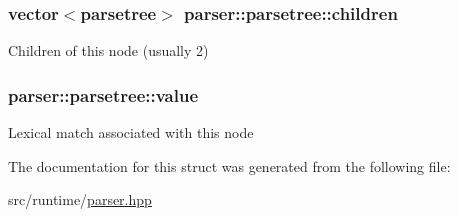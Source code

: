 \subsubsection[{\texorpdfstring{children}{children}}]{\setlength{\rightskip}{0pt plus 5cm}vector$<${\bf parsetree}$>$ parser\+::parsetree\+::children}\hypertarget{structparser_1_1parsetree_a46c4ae92fc6d3fb1ac7cbe2827728149}{}\label{structparser_1_1parsetree_a46c4ae92fc6d3fb1ac7cbe2827728149}
Children of this node (usually 2) 
\subsubsection[{\texorpdfstring{value}{value}}]{ parser\+::parsetree\+::value}\hypertarget{structparser_1_1parsetree_a4ee1d9214dd2a25fcf0494afaa9be7d7}{}\label{structparser_1_1parsetree_a4ee1d9214dd2a25fcf0494afaa9be7d7}
Lexical match associated with this node 

The documentation for this struct was generated from the following file\+:\begin{DoxyCompactItemize}
\item 
src/runtime/\hyperlink{parser_8hpp}{parser.\+hpp}\end{DoxyCompactItemize}
